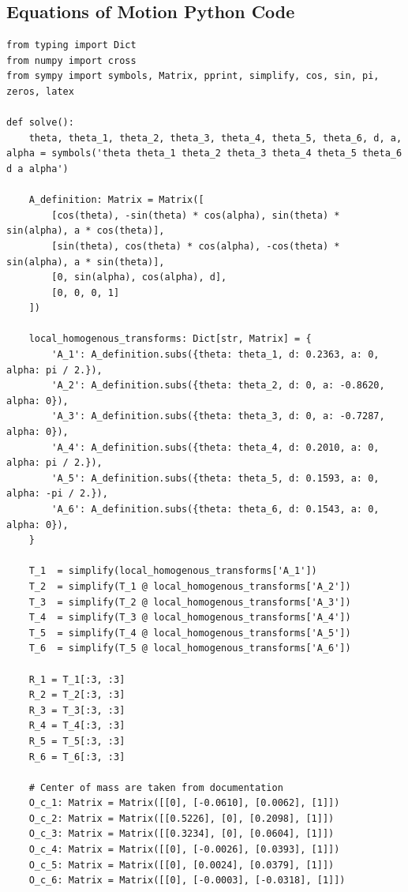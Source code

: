 \documentclass[journal]{new-aiaa}
\begin{document}
\subsection*{Equations of Motion Python Code}\label{sec:Equations of Motion:Python Code}
\begin{verbatim}
from typing import Dict
from numpy import cross
from sympy import symbols, Matrix, pprint, simplify, cos, sin, pi, zeros, latex

def solve():
    theta, theta_1, theta_2, theta_3, theta_4, theta_5, theta_6, d, a, alpha = symbols('theta theta_1 theta_2 theta_3 theta_4 theta_5 theta_6 d a alpha')

    A_definition: Matrix = Matrix([
        [cos(theta), -sin(theta) * cos(alpha), sin(theta) * sin(alpha), a * cos(theta)],
        [sin(theta), cos(theta) * cos(alpha), -cos(theta) * sin(alpha), a * sin(theta)],
        [0, sin(alpha), cos(alpha), d],
        [0, 0, 0, 1]
    ])

    local_homogenous_transforms: Dict[str, Matrix] = {
        'A_1': A_definition.subs({theta: theta_1, d: 0.2363, a: 0, alpha: pi / 2.}),
        'A_2': A_definition.subs({theta: theta_2, d: 0, a: -0.8620, alpha: 0}),
        'A_3': A_definition.subs({theta: theta_3, d: 0, a: -0.7287, alpha: 0}),
        'A_4': A_definition.subs({theta: theta_4, d: 0.2010, a: 0, alpha: pi / 2.}),
        'A_5': A_definition.subs({theta: theta_5, d: 0.1593, a: 0, alpha: -pi / 2.}),
        'A_6': A_definition.subs({theta: theta_6, d: 0.1543, a: 0, alpha: 0}),
    }

    T_1  = simplify(local_homogenous_transforms['A_1'])
    T_2  = simplify(T_1 @ local_homogenous_transforms['A_2'])
    T_3  = simplify(T_2 @ local_homogenous_transforms['A_3'])
    T_4  = simplify(T_3 @ local_homogenous_transforms['A_4'])
    T_5  = simplify(T_4 @ local_homogenous_transforms['A_5'])
    T_6  = simplify(T_5 @ local_homogenous_transforms['A_6'])

    R_1 = T_1[:3, :3]
    R_2 = T_2[:3, :3]
    R_3 = T_3[:3, :3]
    R_4 = T_4[:3, :3]
    R_5 = T_5[:3, :3]
    R_6 = T_6[:3, :3]

    # Center of mass are taken from documentation
    O_c_1: Matrix = Matrix([[0], [-0.0610], [0.0062], [1]])
    O_c_2: Matrix = Matrix([[0.5226], [0], [0.2098], [1]])
    O_c_3: Matrix = Matrix([[0.3234], [0], [0.0604], [1]])
    O_c_4: Matrix = Matrix([[0], [-0.0026], [0.0393], [1]])
    O_c_5: Matrix = Matrix([[0], [0.0024], [0.0379], [1]])
    O_c_6: Matrix = Matrix([[0], [-0.0003], [-0.0318], [1]])


\end{verbatim}
\end{document}
